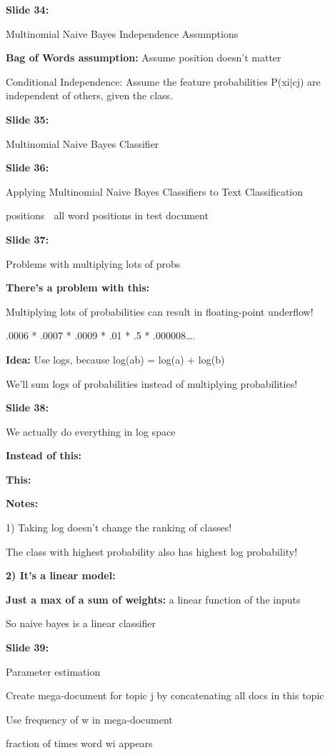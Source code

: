 \documentclass[11pt,a4paper]{article}
\begin{document}
\textbf{Slide 34:}

Multinomial Naive Bayes Independence Assumptions

\textbf{Bag of Words assumption:}  Assume position doesn’t matter

Conditional Independence: Assume the feature probabilities P(xi|cj) are independent of others, given the class.

\textbf{Slide 35:}

Multinomial Naive Bayes Classifier

\textbf{Slide 36:}

Applying Multinomial Naive Bayes Classifiers to Text Classification

positions  all word positions in test document

\textbf{Slide 37:}

Problems with multiplying lots of probs

\textbf{There's a problem with this:} 

Multiplying lots of probabilities can result in floating-point underflow!

.0006 * .0007 * .0009 * .01 * .5 * .000008….

\textbf{Idea:}    Use logs, because  log(ab) = log(a) + log(b)

We'll sum logs of probabilities instead of multiplying probabilities!

\textbf{Slide 38:}

We actually do everything in log space

\textbf{Instead of this:} 

\textbf{This:} 

\textbf{Notes:} 

1) Taking log doesn't change the ranking of classes!

The class with highest probability also has highest log probability!

\textbf{2) It's a linear model:} 

\textbf{Just a max of a sum of weights:}  a linear function of the inputs

So naive bayes is a linear classifier

\textbf{Slide 39:}

Parameter estimation

Create mega-document for topic j by concatenating all docs in this topic

Use frequency of w in mega-document

fraction of times word wi appears
\end{document}
